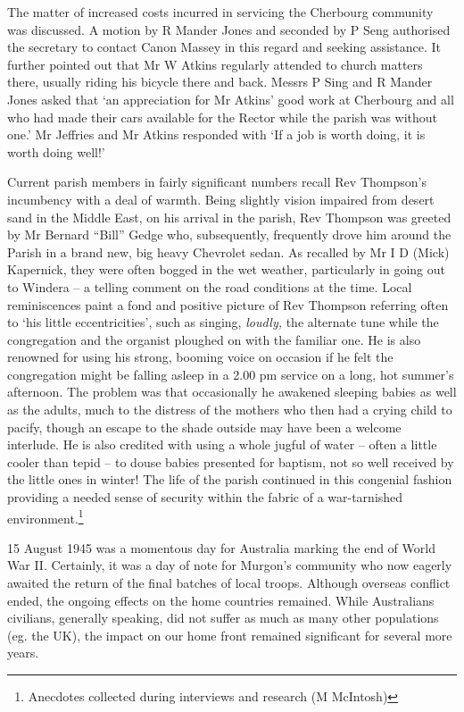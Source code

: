 The matter of increased costs incurred in servicing the Cherbourg community was discussed. A motion by R Mander Jones and seconded by P Seng authorised the secretary to contact Canon Massey in this regard and seeking assistance. It further pointed out that Mr W Atkins regularly attended to church matters there, usually riding his bicycle there and back. Messrs P Sing and R Mander Jones asked that `an appreciation for Mr Atkins' good work at Cherbourg and all who had made their cars available for the Rector while the parish was without one.' Mr Jeffries and Mr Atkins responded with `If a job is worth doing, it is worth doing well!'



Current parish members in fairly significant numbers recall Rev Thompson's incumbency with a deal of warmth. Being slightly vision impaired from desert sand in the Middle East, on his arrival in the parish, Rev Thompson was greeted by Mr Bernard ``Bill'' Gedge who, subsequently, frequently drove him around the Parish in a brand new, big heavy Chevrolet sedan. As recalled by Mr I D (Mick) Kapernick, they were often bogged in the wet weather, particularly in going out to Windera -- a telling comment on the road conditions at the time. Local reminiscences paint a fond and positive picture of Rev Thompson referring often to `his little eccentricities', such as singing, \emph{loudly,} the alternate tune while the congregation and the organist ploughed on with the familiar one. He is also renowned for using his strong, booming voice on occasion if he felt the congregation might be falling asleep in a 2.00 pm service on a long, hot summer's afternoon. The problem was that occasionally he awakened sleeping babies as well as the adults, much to the distress of the mothers who then had a crying child to pacify, though an escape to the shade outside may have been a welcome interlude. He is also credited with using a whole jugful of water -- often a little cooler than tepid -- to douse babies presented for baptism, not so well received by the little ones in winter! The life of the parish continued in this congenial fashion providing a needed sense of security within the fabric of a war-tarnished environment.\footnote{Anecdotes collected during interviews and research (M McIntosh)}


15 August 1945 was a momentous day for Australia marking the end of World War II. Certainly, it was a day of note for Murgon's community who now eagerly awaited the return of the final batches of local troops. Although overseas conflict ended, the ongoing effects on the home countries remained. While Australians civilians, generally speaking, did not suffer as much as many other populations (eg. the UK), the impact on our home front remained significant for several more years.



